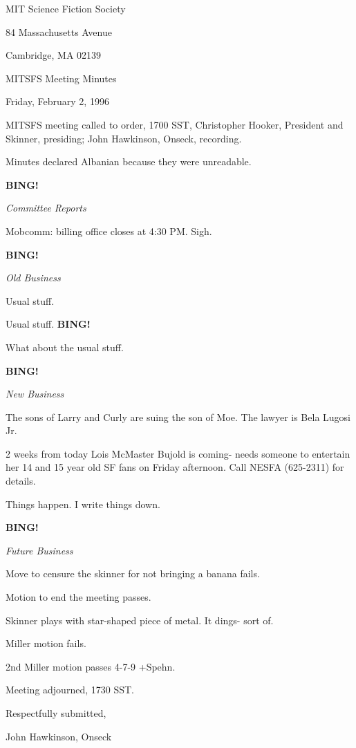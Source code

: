 \documentclass[12pt]{article}
\newcommand{\bing}{{\bf BING!} }
\newcommand{\goto}[1]{\bing \vskip 12pt \centerline{{\em{#1}}}}
\begin{document}
\begin{center}

MIT Science Fiction Society 

84 Massachusetts Avenue

Cambridge, MA 02139

\vspace{12pt}

MITSFS Meeting Minutes 

Friday, February 2, 1996

\end{center}
 
\vspace{18pt}

\setlength{\parskip}{6pt}

\noindent
MITSFS meeting called to order, 1700 SST,
Christopher Hooker, President and Skinner, presiding; John Hawkinson, Onseck, recording.

Minutes declared Albanian because they were unreadable.

\goto{Committee Reports}

Mobcomm: billing office closes at 4:30 PM. Sigh.

\goto{Old Business}

Usual stuff.

Usual stuff. \bing

What about the usual stuff.

\goto{New Business}

The sons of Larry and Curly are suing the son of Moe. The lawyer is Bela Lugosi Jr.

2 weeks from today Lois McMaster Bujold is coming- needs someone to entertain her 14 and 15 year old SF fans on Friday afternoon. Call NESFA (625-2311) for details.

Things happen. I write things down.

\goto{Future Business}

Move to censure the skinner for not bringing a banana fails.

Motion to end the meeting passes.

Skinner plays with star-shaped piece of metal. It dings- sort of.

Miller motion fails.

2nd Miller motion passes 4-7-9 +Spehn.

\vspace{12pt}

\noindent
Meeting adjourned, 1730 SST.

\vspace{18pt}

\centerline{Respectfully submitted,}
\centerline{John Hawkinson, Onseck}
\end{document}
